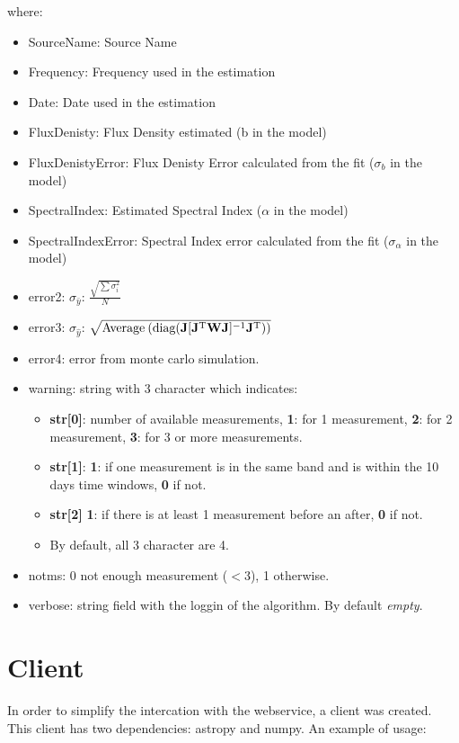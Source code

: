 \documentclass[10pt]{article}
\begin{document}
\noindent where:
\begin{itemize}
    \item SourceName: Source Name
    \item Frequency: Frequency used in the estimation
    \item Date: Date used in the estimation
    \item FluxDenisty: Flux Density estimated (b in the model)
    \item FluxDenistyError: Flux Denisty Error calculated from the fit ($\sigma_b$ in the model)
    \item SpectralIndex: Estimated Spectral Index ($\alpha$ in the model) 
    \item SpectralIndexError: Spectral Index error calculated from the fit ($\sigma_{\alpha}$ in the model)
    \item error2: $\sigma_{\bar{y}}$: $\frac{\sqrt{\sum\sigma_i^2}}{N}$
    \item error3: $\sigma_{\hat{y}}$: $\sqrt{\text{Average\:}(\text{diag}(\mathbf{J}[\mathbf{J}^{\text{T}}\mathbf{W}\mathbf{J}]^{-1}\mathbf{J}^{\text{T}}))} $
    \item error4: error from monte carlo simulation.
    \item warning: string with 3 character which indicates:
        \begin{itemize} 
            \item \textbf{str[0]}: number of available measurements, \textbf{1}: for 1 measurement, \textbf{2}: for 2 measurement, \textbf{3}: for 3 or more measurements.
            \item \textbf{str[1]}: \textbf{1}: if one measurement is in the same band and is within the 10 days time windows, \textbf{0} if not.
            \item \textbf{str[2]} \textbf{1}: if there is at least 1 measurement before an after, \textbf{0} if not.
            \item By default, all 3 character are 4.
        \end{itemize}
    \item notms: 0 not enough measurement ($<$3), 1 otherwise.
    \item verbose: string field with the loggin of the algorithm. By default \emph{empty}.
\end{itemize}

\section{Client}
In order to simplify the intercation with the webservice, a client was created.
This client has two dependencies: astropy and numpy. An example of usage:
\end{document}
